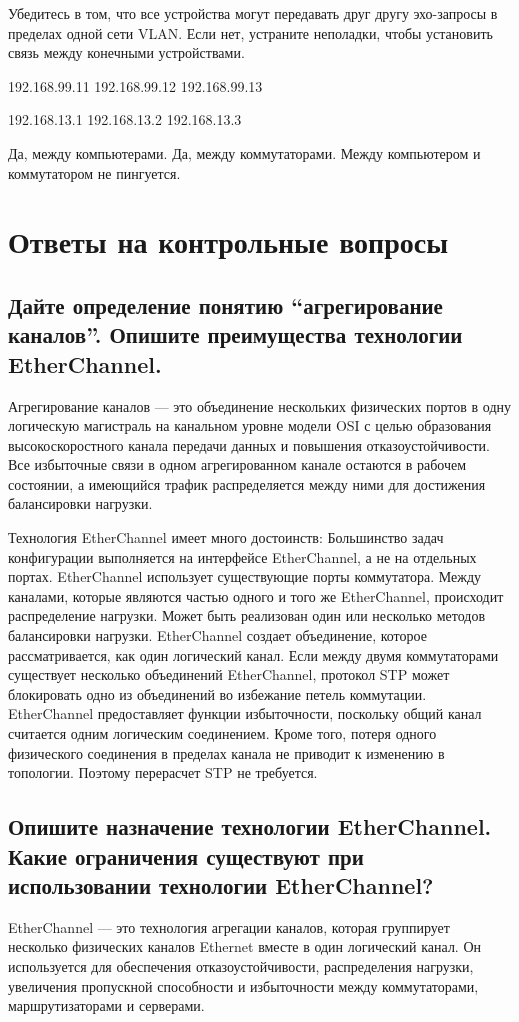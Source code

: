 Убедитесь в том, что все устройства могут передавать друг другу эхо-запросы
в пределах одной сети VLAN.
Если нет, устраните неполадки,
чтобы установить связь между конечными устройствами.

192.168.99.11
192.168.99.12
192.168.99.13

192.168.13.1
192.168.13.2
192.168.13.3

Да, между компьютерами. Да, между коммутаторами.
Между компьютером и коммутатором не пингуется.

\section{Ответы на контрольные вопросы}
\subsection{Дайте определение понятию “агрегирование каналов”. Опишите 
преимущества технологии EtherChannel.}
Агрегирование каналов — это объединение нескольких физических 
портов в одну логическую магистраль на канальном уровне модели OSI с 
целью образования высокоскоростного канала передачи данных и 
повышения отказоустойчивости. Все избыточные связи в одном 
агрегированном канале остаются в рабочем состоянии, а имеющийся трафик 
распределяется между ними для достижения балансировки нагрузки.

Технология EtherChannel имеет много достоинств:
Большинство задач конфигурации выполняется на интерфейсе 
EtherChannel, а не на отдельных портах.
EtherChannel использует существующие порты коммутатора.
Между каналами, которые являются частью одного и того же 
EtherChannel, происходит распределение нагрузки. Может быть 
реализован один или несколько методов балансировки нагрузки.
EtherChannel создает объединение, которое рассматривается, как один 
логический канал. Если между двумя коммутаторами существует 
несколько объединений EtherChannel, протокол STP может 
блокировать одно из объединений во избежание петель коммутации.
EtherChannel предоставляет функции избыточности, поскольку общий 
канал считается одним логическим соединением. Кроме того, потеря 
одного физического соединения в пределах канала не приводит к 
изменению в топологии. Поэтому перерасчет STP не требуется.

\subsection{Опишите назначение технологии EtherChannel. Какие 
ограничения существуют при использовании технологии 
EtherChannel?}
EtherChannel --- это технология агрегации каналов, которая 
группирует несколько физических каналов Ethernet вместе в один логический 
канал. Он используется для обеспечения отказоустойчивости, распределения 
нагрузки, увеличения пропускной способности и избыточности между 
коммутаторами, маршрутизаторами и серверами.

